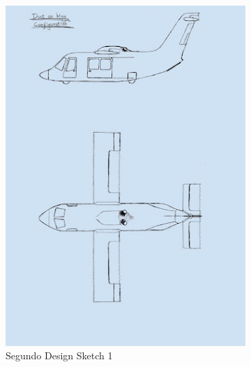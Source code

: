 \begin{figure}[h]
    \centering
    \begin{subfigure}[b]{0.47\textwidth}
        \includegraphics[width=\textwidth]{Imagens/segundodesign1.jpg}
        \caption{Segundo Design Sketch 1}
        \label{SecondDesingSketchini1}
    \end{subfigure}
    \hfill
    \begin{subfigure}[b]{0.47\textwidth}

\end{subfigure}
\end{figure}
